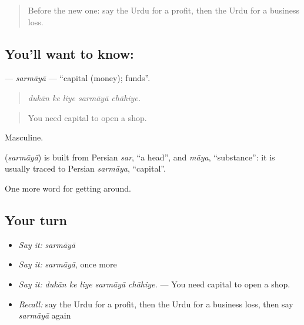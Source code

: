 \label{lesson:UR-C419-sarmaya}



\begin{quote}
Before the new one: say the Urdu for a profit, then the Urdu for a business loss.
\end{quote}

\subsection*{You'll want to know: }
\textbf{} — \emph{sarmāyā} — \textquotedblleft{}capital (money); funds\textquotedblright{}.

\begin{quote}
    
\end{quote}

\begin{quote}
\emph{dukān ke liye sarmāyā chāhiye.}
\end{quote}

\begin{quote}
You need capital to open a shop.
\end{quote}

Masculine.

\begin{cousinweb}
\textbf{} (\emph{sarmāyā}) is built from Persian \emph{sar}, \textquotedblleft{}a head\textquotedblright{}, and \emph{māya}, \textquotedblleft{}substance\textquotedblright{}: it is usually traced to Persian \emph{sarmāya}, \textquotedblleft{}capital\textquotedblright{}.
\end{cousinweb}

\begin{grammarlens}[title={What you've built}]
One more word for getting around.
\end{grammarlens}

\subsection*{Your turn}
\begin{itemize}
\raggedright
  \item \emph{Say it:} \emph{sarmāyā}
  \item \emph{Say it:} \emph{sarmāyā}, once more
  \item \emph{Say it:} \emph{dukān ke liye sarmāyā chāhiye.} — You need capital to open a shop.
  \item \emph{Recall:} say the Urdu for a profit, then the Urdu for a business loss, then say \emph{sarmāyā} again
\end{itemize}

